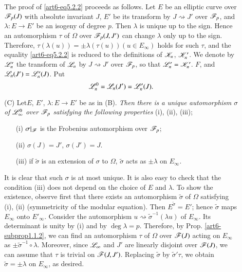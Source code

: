 \begin{itemize}
The proof of \eqref{art6-eq5.2.2} proceeds as follows. Let $E$ be an elliptic curve over $\mathscr{F}_p(J)$ with absolute invariant $J$, $E'$ be its transform by $J \rightsquigarrow J'$ over $\mathscr{F}_p$, and $\lambda: E \to E'$ be an isogeny of degree $p$. Then $\lambda$ is unique up to the sign. Hence an automorphism $\tau$ of $\Omega$ over $\mathscr{F}_p (J, J')$ can change $\lambda$ only up to the sign. Therefore, $\tau (\lambda (u)) = \pm \lambda (\tau (u)) (u \in E_\infty)$ holds for such $\tau$, and the equality \eqref{art6-eq5.2.2} is reduced to the definitions of $\mathscr{K}_n$, $\mathscr{K}'_n$. We denote by $\mathscr{L}'_n$ the transform of $\mathscr{L}_n$ by $J \rightsquigarrow J' $ over $\mathscr{F}_p$, so that $\mathscr{L}'_n = \mathscr{K}'_n$. $F$, and $\mathscr{L}_n(J') = \mathscr{L}'_n(J)$. Put
$$
\mathscr{L}^0_n = \mathscr{L}_n(J') = \mathscr{L}'_n (J).
$$

\item[(C)] Let\pageoriginale $E$, $E'$, $\lambda : E \to E'$ be as in (B). \textit{Then there is a unique automorphism $\sigma$ of $\mathscr{L}^0_\infty$ over $\mathscr{F}_p$ satisfying the following properties} (i), (ii), (iii);
\begin{itemize}
\item[(i)] $\sigma|_{\mathscr{F}}$ is the Frobenius automorphism over $\mathscr{F}_p$;

\item[(ii)] $\sigma (J) = J'$, $\sigma (J') = J$.

\item[(iii)] if $\tilde{\sigma}$ is an extension of $\sigma$ to $\Omega$, $\tilde{\sigma}$ acts as $\pm \lambda$ on $E_\infty$.
\end{itemize}
 
It is clear that such $\sigma$ is at most unique. It is also easy to check that the condition (iii) does not depend on the choice of $E$ and $\lambda$. To show the existence, observe first that there  exists an automorphism $\tilde{\sigma}$ of $\Omega$ satisfying (i), (ii) (symmetricity of the modular equation). Then $E^{\tilde{\sigma}} = E'$; hence $\tilde{\sigma}$   maps $E_\infty$ onto $E'_\infty$. Consider the automorphism $u \rightsquigarrow \tilde{\sigma}^{-1}(\lambda u)$ of $E_\infty$. Its determinant is unity by (i) and by $\deg \lambda =p$. Therefore, by Prop. \ref{art6-subprop1.1.2}, we can find an automorphism $\tau$ of $\Omega$ over $\mathscr{F} (J)$ acting on $E_\infty$ as $\pm \tilde{\sigma}^{-1} \circ \lambda$. Moreover, since $\mathscr{L}_\infty$ and $J'$ are linearly disjoint over $\mathscr{F}(J)$, we can assume that $\tau$ is trivial on $\mathscr{F} (J, J')$. Replacing $\tilde{\sigma}$ by $\tilde{\sigma}' \tau$, we obtain $\tilde{\sigma} = \pm \lambda$ on $E_\infty$, as desired.



\end{itemize}
